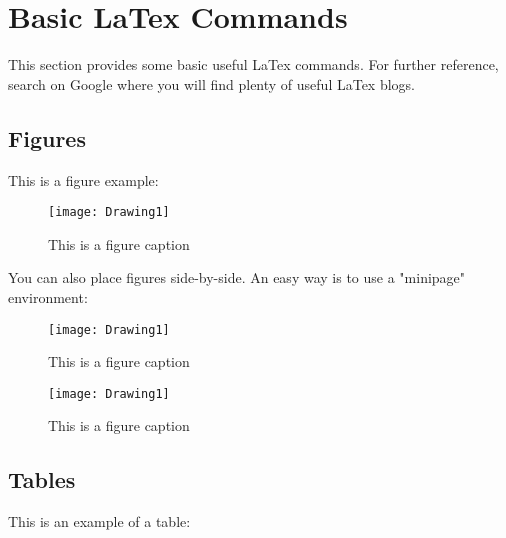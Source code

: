 \section{Basic LaTex Commands}
This section provides some basic useful LaTex commands. For further reference, search on Google where you will find plenty of useful LaTex blogs.

\subsection{Figures}

This is a figure example:

\begin{figure}[H] %
\centering
\texttt{[image: Drawing1]} %
\caption{This is a figure caption}
\label{fig:figure1_label}
\end{figure}

You can also place figures side-by-side. An easy way is to use a "minipage" environment:

\begin{minipage}[b]{0.45\linewidth}  %
\begin{figure}[H]
\centering
\texttt{[image: Drawing1]}
\caption{This is a figure caption}
\label{fig:figure2_label}
\end{figure}
\end{minipage}

\hspace{2mm} %

\begin{minipage}[b]{0.45\linewidth}
\begin{figure}[H]
\centering
\texttt{[image: Drawing1]}
\caption{This is a figure caption}
\label{fig:figure3_label}
\end{figure}
\end{minipage}


\subsection{Tables}

This is an example of a table:

